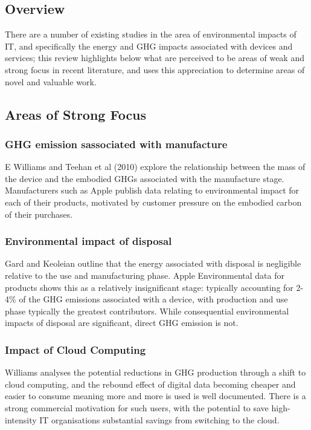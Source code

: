 \documentclass[conference]{IEEEtran}
\begin{document}
\subsection{Overview}

There are a number of existing studies in the area of environmental
impacts of IT, and specifically the energy and GHG impacts associated
with devices and services; this review highlights below what are
perceived to be areas of weak and strong focus in recent literature,
and uses this appreciation to determine areas of novel and valuable
work.

\subsection{Areas of Strong Focus}

\subsubsection{GHG emission sassociated with manufacture}

E Williams and Teehan et al (2010) explore the relationship between
the mass of the device and the embodied GHGs associated with the
manufacture stage. Manufacturers such as Apple publish data relating
to environmental impact for each of their products, motivated by
customer pressure on the embodied carbon of their purchases.

\subsubsection{Environmental impact of disposal}

Gard and Keoleian outline that the energy associated with disposal is
negligible relative to the use and manufacturing phase. Apple
Environmental data for products shows this as a relatively
insignificant stage: typically accounting for 2-4\% of the GHG
emissions associated with a device, with production and use phase
typically the greatest contributors. While consequential environmental
impacts of disposal are significant, direct GHG emission is not.

\subsubsection{Impact of Cloud Computing}

Williams analyses the potential reductions in GHG production through a
shift to cloud computing, and the rebound effect of digital data
becoming cheaper and easier to consume meaning more and more is used
is well documented. There is a strong commercial motivation for such
users, with the potential to save high-intensity IT organisations
substantial savings from switching to the cloud.
\end{document}
